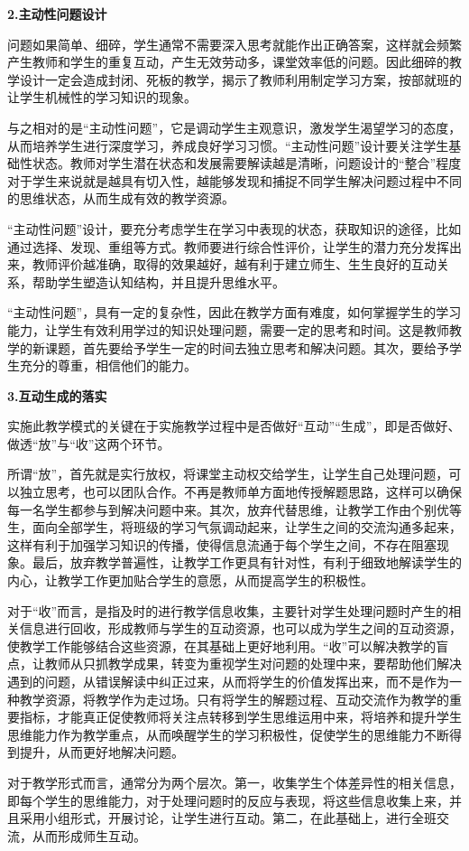 \documentclass{article}
\begin{document}
\textbf{2.主动性问题设计}

问题如果简单、细碎，学生通常不需要深入思考就能作出正确答案，这样就会频繁产生教师和学生的重复互动，产生无效劳动多，课堂效率低的问题。因此细碎的教学设计一定会造成封闭、死板的教学，揭示了教师利用制定学习方案，按部就班的让学生机械性的学习知识的现象。

与之相对的是“主动性问题”，它是调动学生主观意识，激发学生渴望学习的态度，从而培养学生进行深度学习，养成良好学习习惯。“主动性问题”设计要关注学生基础性状态。教师对学生潜在状态和发展需要解读越是清晰，问题设计的“整合”程度对于学生来说就是越具有切入性，越能够发现和捕捉不同学生解决问题过程中不同的思维状态，从而生成有效的教学资源。

“主动性问题”设计，要充分考虑学生在学习中表现的状态，获取知识的途径，比如通过选择、发现、重组等方式。教师要进行综合性评价，让学生的潜力充分发挥出来，教师评价越准确，取得的效果越好，越有利于建立师生、生生良好的互动关系，帮助学生塑造认知结构，并且提升思维水平。

“主动性问题”，具有一定的复杂性，因此在教学方面有难度，如何掌握学生的学习能力，让学生有效利用学过的知识处理问题，需要一定的思考和时间。这是教师教学的新课题，首先要给予学生一定的时间去独立思考和解决问题。其次，要给予学生充分的尊重，相信他们的能力。

\textbf{3.互动生成的落实}

实施此教学模式的关键在于实施教学过程中是否做好“互动”“生成”，即是否做好、做透“放”与“收”这两个环节。

所谓“放”，首先就是实行放权，将课堂主动权交给学生，让学生自己处理问题，可以独立思考，也可以团队合作。不再是教师单方面地传授解题思路，这样可以确保每一名学生都参与到解决问题中来。其次，放弃代替思维，让教学工作由个别优等生，面向全部学生，将班级的学习气氛调动起来，让学生之间的交流沟通多起来，这样有利于加强学习知识的传播，使得信息流通于每个学生之间，不存在阻塞现象。最后，放弃教学普遍性，让教学工作更具有针对性，有利于细致地解读学生的内心，让教学工作更加贴合学生的意愿，从而提高学生的积极性。

对于“收”而言，是指及时的进行教学信息收集，主要针对学生处理问题时产生的相关信息进行回收，形成教师与学生的互动资源，也可以成为学生之间的互动资源，使教学工作能够结合这些资源，在其基础上更好地利用。“收”可以解决教学的盲点，让教师从只抓教学成果，转变为重视学生对问题的处理中来，要帮助他们解决遇到的问题，从错误解读中纠正过来，从而将学生的价值发挥出来，而不是作为一种教学资源，将教学作为走过场。只有将学生的解题过程、互动交流作为教学的重要指标，才能真正促使教师将关注点转移到学生思维运用中来，将培养和提升学生思维能力作为教学重点，从而唤醒学生的学习积极性，促使学生的思维能力不断得到提升，从而更好地解决问题。

对于教学形式而言，通常分为两个层次。第一，收集学生个体差异性的相关信息，即每个学生的思维能力，对于处理问题时的反应与表现，将这些信息收集上来，并且采用小组形式，开展讨论，让学生进行互动。第二，在此基础上，进行全班交流，从而形成师生互动。    
\end{document}
